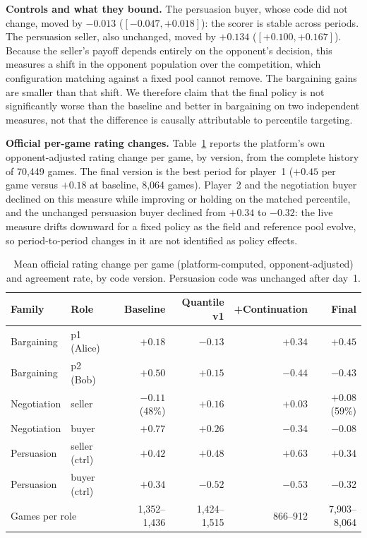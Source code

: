 \documentclass{article}
\begin{document}
\textbf{Controls and what they bound.} The persuasion buyer, whose code did
not change, moved by $-0.013$ ($[-0.047,+0.018]$): the scorer is stable across
periods. The persuasion seller, also unchanged, moved by $+0.134$
($[+0.100,+0.167]$). Because the seller's payoff depends entirely on the
opponent's decision, this measures a shift in the opponent population over the
competition, which configuration matching against a fixed pool cannot remove.
The bargaining gains are smaller than that shift. We therefore claim that the
final policy is not significantly worse than the baseline and better in bargaining on two
independent measures, not that the difference is causally attributable to
percentile targeting.

\textbf{Official per-game rating changes.} Table~\ref{tab:official} reports
the platform's own opponent-adjusted rating change per game, by version, from
the complete history of 70{,}449 games. The final version is the best period
for player~1 ($+0.45$ per game versus $+0.18$ at baseline, 8{,}064 games).
Player~2 and the negotiation buyer declined on this measure while improving
or holding on the matched percentile, and the unchanged persuasion buyer
declined from $+0.34$ to $-0.32$: the live measure drifts downward for a fixed
policy as the field and reference pool evolve, so period-to-period changes in
it are not identified as policy effects.

\begin{table}[t]
  \centering
  \small
  \caption{Mean official rating change per game (platform-computed,
  opponent-adjusted) and agreement rate, by code version. Persuasion code was
  unchanged after day~1.}
  \label{tab:official}
  \begin{tabular}{llrrrr}
    \toprule
    Family & Role & Baseline & Quantile v1 & +Continuation & Final \\
    \midrule
    Bargaining & p1 (Alice) & $+0.18$ & $-0.13$ & $+0.34$ & $\mathbf{+0.45}$ \\
    Bargaining & p2 (Bob)   & $+0.50$ & $+0.15$ & $-0.44$ & $-0.43$ \\
    Negotiation & seller & $-0.11$ (48\%) & $+0.16$ & $+0.03$ & $+0.08$ (59\%) \\
    Negotiation & buyer  & $+0.77$ & $+0.26$ & $-0.34$ & $-0.08$ \\
    Persuasion & seller (ctrl) & $+0.42$ & $+0.48$ & $+0.63$ & $+0.34$ \\
    Persuasion & buyer (ctrl)  & $+0.34$ & $-0.52$ & $-0.53$ & $-0.32$ \\
    \midrule
    \multicolumn{2}{l}{Games per role} & 1{,}352--1{,}436 & 1{,}424--1{,}515 & 866--912 & 7{,}903--8{,}064 \\
    \bottomrule
  \end{tabular}
\end{table}
\end{document}
